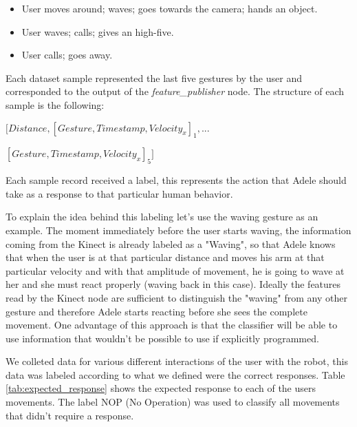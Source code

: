 \begin{itemize}
\item User moves around; waves; goes towards the camera; hands an object.
\item User waves; calls; gives an high-five.
\item User calls; goes away.
\end{itemize}

Each dataset sample represented the last five gestures by the user and corresponded to the output of the \textit{feature\_publisher} node. The structure of each sample is the following:

\vspace*{4pt}
$\Big[Distance, [Gesture, Timestamp, Velocity_x]_1,...$

$[Gesture, Timestamp, Velocity_x]_5\Big]$
\vspace*{4pt}

Each sample record received a label, this represents the action that Adele should take as a response to that particular human behavior.

To explain the idea behind this labeling let's use the waving gesture as an example. The moment immediately before the user starts waving, the information coming from the Kinect is already labeled as a "Waving", so that Adele knows that when the user is at that particular distance and moves his arm at that particular velocity and with that amplitude of movement, he is going to wave at her and she must react properly (waving back in this case). Ideally the features read by the Kinect node are sufficient to distinguish the "waving" from any other gesture and therefore Adele starts reacting before she sees the complete movement. One advantage of this approach is that the classifier will be able to use information that wouldn't be possible to use if explicitly programmed.

We colleted data for various different interactions of the user with the robot, this data was labeled according to what we defined were the correct responses. Table \ref{tab:expected_response} shows the expected response to each of the users movements. The label NOP (No Operation) was used to classify all movements that didn't require a response.

